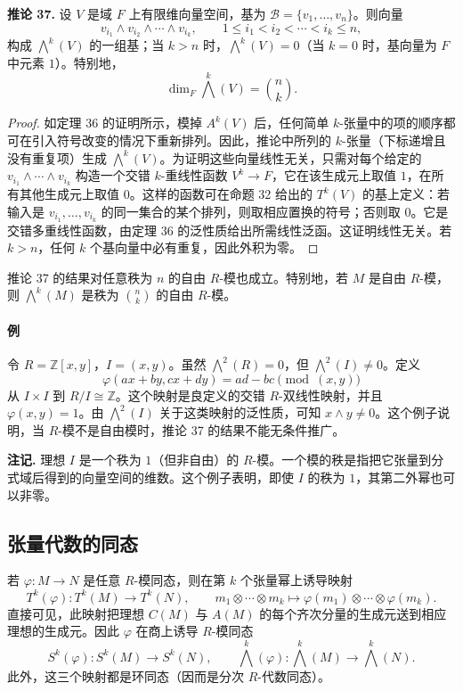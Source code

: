 \noindent\textbf{推论 37.} 设 $V$ 是域 $F$ 上有限维向量空间，基为 $\mathcal B=\{v_1,
\ldots,v_n\}$。则向量
\[
v_{i_1}\wedge v_{i_2}\wedge\cdots\wedge v_{i_k},
\qquad
1\leq i_1<i_2<\cdots<i_k\leq n,
\]
构成 $\bigwedge^k(V)$ 的一组基；当 $k>n$ 时，$\bigwedge^k(V)=0$（当 $k=0$ 时，基向量为 $F$ 中元素 $1$）。特别地，
\[
\dim_F\bigwedge^k(V)=\binom nk.
\]

\begin{proof}
如定理 36 的证明所示，模掉 $A^k(V)$ 后，任何简单 $k$-张量中的项的顺序都可在引入符号改变的情况下重新排列。因此，推论中所列的 $k$-张量（下标递增且没有重复项）生成 $\bigwedge^k(V)$。为证明这些向量线性无关，只需对每个给定的 $v_{i_1}\wedge\cdots\wedge v_{i_k}$ 构造一个交错 $k$-重线性函数 $V^k\to F$，它在该生成元上取值 $1$，在所有其他生成元上取值 $0$。这样的函数可在命题 32 给出的 $T^k(V)$ 的基上定义：若输入是 $v_{i_1},
\ldots,v_{i_k}$ 的同一集合的某个排列，则取相应置换的符号；否则取 $0$。它是交错多重线性函数，由定理 36 的泛性质给出所需线性泛函。这证明线性无关。若 $k>n$，任何 $k$ 个基向量中必有重复，因此外积为零。
\end{proof}

推论 37 的结果对任意秩为 $n$ 的自由 $R$-模也成立。特别地，若 $M$ 是自由 $R$-模，则 $\bigwedge^k(M)$ 是秩为 $\binom nk$ 的自由 $R$-模。

\paragraph{例}
令 $R=\mathbb Z[x,y]$，$I=(x,y)$。虽然 $\bigwedge^2(R)=0$，但 $\bigwedge^2(I)\neq0$。定义
\[
\varphi(ax+by,cx+dy)=ad-bc\pmod{(x,y)}
\]
从 $I\times I$ 到 $R/I\cong\mathbb Z$。这个映射是良定义的交错 $R$-双线性映射，并且 $\varphi(x,y)=1$。由 $\bigwedge^2(I)$ 关于这类映射的泛性质，可知 $x\wedge y\neq0$。这个例子说明，当 $R$-模不是自由模时，推论 37 的结果不能无条件推广。

\noindent\textbf{注记.} 理想 $I$ 是一个秩为 $1$（但非自由）的 $R$-模。一个模的秩是指把它张量到分式域后得到的向量空间的维数。这个例子表明，即使 $I$ 的秩为 $1$，其第二外幂也可以非零。

\subsection*{张量代数的同态}

若 $\varphi:M\to N$ 是任意 $R$-模同态，则在第 $k$ 个张量幂上诱导映射
\[
T^k(\varphi):T^k(M)\to T^k(N),
\qquad
m_1\otimes\cdots\otimes m_k
\mapsto
\varphi(m_1)\otimes\cdots\otimes\varphi(m_k).
\]
直接可见，此映射把理想 $C(M)$ 与 $A(M)$ 的每个齐次分量的生成元送到相应理想的生成元。因此 $\varphi$ 在商上诱导 $R$-模同态
\[
S^k(\varphi):S^k(M)\to S^k(N),
\qquad
\bigwedge^k(\varphi):\bigwedge^k(M)\to\bigwedge^k(N).
\]
此外，这三个映射都是环同态（因而是分次 $R$-代数同态）。

